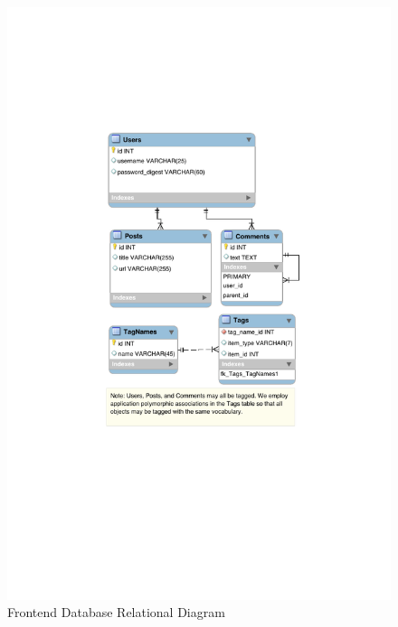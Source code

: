 \documentclass[11pt,letterpaper]{article}
\begin{document}
\begin{figure}
\centering
\includegraphics{img/db_diagram.pdf}
\caption{Frontend Database Relational Diagram}
\label{fig:database}
\end{figure}

\newpage
\appendix
\end{document}
